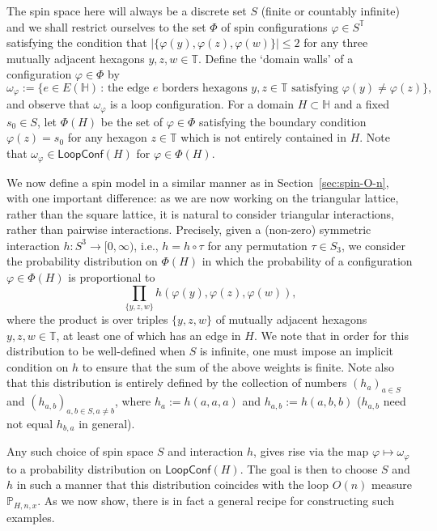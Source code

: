 \documentclass[12pt,reqno]{article}
\def\T{\mathbb{T}}
\renewcommand{\Pr}{\mathbb{P}}
\newcommand{\HH}{\mathbb{H}}
\newcommand{\LC}{\mathsf{LoopConf}}
\begin{document}
The spin space here will always be a discrete set $S$ (finite or countably infinite) and we shall restrict ourselves to the set $\Phi$ of spin configurations $\varphi \in S^\T$ satisfying the condition that $|\{ \varphi(y),\varphi(z),\varphi(w)\}| \le 2$ for any three mutually adjacent hexagons $y,z,w \in \T$.
Define the `domain walls' of a configuration $\varphi \in \Phi$ by
\begin{equation*}
\omega_\varphi := \big\{e \in E(\HH) \,:\, \text{the edge $e$ borders hexagons $y,z\in\T$ satisfying $\varphi(y)\neq \varphi(z)$}\big\},
\end{equation*}
and observe that $\omega_\varphi$ is a loop configuration.
For a domain $H \subset \HH$ and a fixed $s_0 \in S$, let $\Phi(H)$ be the set of $\varphi\in \Phi$ satisfying the boundary condition $\varphi(z)=s_0$ for any hexagon $z \in \T$ which is not entirely contained in $H$. Note that $\omega_\varphi\in\LC(H)$ for $\varphi\in\Phi(H)$.


We now define a spin model in a similar manner as in Section~\ref{sec:spin-O-n}, with one important difference: as we are now working on the triangular lattice, rather than the square lattice, it is natural to consider triangular interactions, rather than pairwise interactions. Precisely, given a (non-zero) symmetric interaction $h \colon S^3 \to [0,\infty)$, i.e., $h=h \circ \tau$ for any permutation $\tau \in S_3$, we consider the probability distribution on $\Phi(H)$ in which the probability of a configuration $\varphi \in \Phi(H)$ is proportional to
\begin{equation}\label{eq:triangle-interaction}
\prod_{\{y,z,w\}} h(\varphi(y),\varphi(z),\varphi(w)) ,
\end{equation}
where the product is over triples $\{y,z,w\}$ of mutually adjacent hexagons $y,z,w \in \T$, at least one of which has an edge in $H$. We note that in order for this distribution to be well-defined when $S$ is infinite, one must impose an implicit condition on $h$ to ensure that the sum of the above weights is finite. Note also that this distribution is entirely defined by the collection of numbers $(h_a)_{a \in S}$ and $(h_{a,b})_{a,b \in S, a \neq b}$, where $h_a := h(a,a,a)$ and $h_{a,b} := h(a,b,b)$ ($h_{a,b}$ need not equal $h_{b,a}$ in general).


Any such choice of spin space $S$ and interaction $h$, gives rise via the map $\varphi \mapsto \omega_\varphi$ to a probability distribution on $\LC(H)$. The goal is then to choose $S$ and $h$ in such a manner that this distribution coincides with the loop $O(n)$ measure $\Pr_{H,n,x}$.
As we now show, there is in fact a general recipe for constructing such examples.
\end{document}

